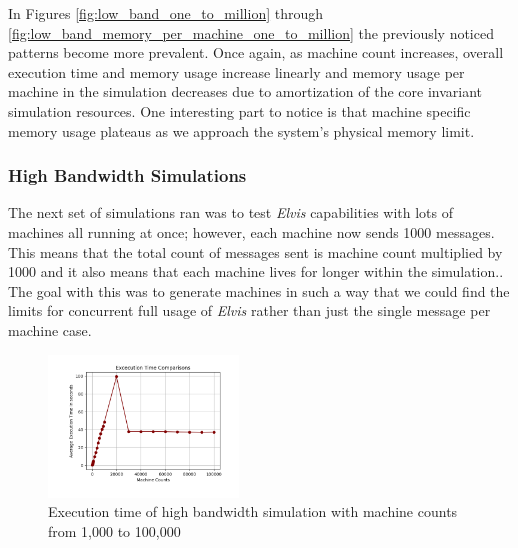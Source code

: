 \documentclass[journal]{IEEEtran} %
\newcommand{\imagewidth}{0.45\textwidth}
\newcommand{\elvis}{\textit{Elvis}}
\begin{document}
In Figures \ref{fig:low_band_one_to_million} through \ref{fig:low_band_memory_per_machine_one_to_million} the previously noticed patterns become more prevalent. Once again, as machine count increases, overall execution time and memory usage increase linearly and memory usage per machine in the simulation decreases due to amortization of the core invariant simulation resources. One interesting part to notice is that machine specific memory usage plateaus as we approach the system's physical memory limit.

\subsubsection{High Bandwidth Simulations}
The next set of simulations ran was to test \elvis{} capabilities with lots of machines all running at once; however, each machine now sends 1000 messages. This means that the total count of messages sent is machine count multiplied by 1000 and it also means that each machine lives for longer within the simulation.. The goal with this was to generate machines in such a way that we could find the limits for concurrent full usage of \elvis{} rather than just the single message per machine case.

\begin{figure}[H]
    \centerline{\includegraphics[width=\imagewidth]{Images/time_high_band.png}}
    \caption{Execution time of high bandwidth simulation with machine counts from 1,000 to 100,000}
    \label{fig:time_high_band}
\end{figure}
\end{document}
